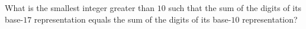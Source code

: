 What is the smallest integer greater than $10$ such that the sum of the digits of its base-$17$ representation equals the sum of the digits of its base-$10$ representation?
